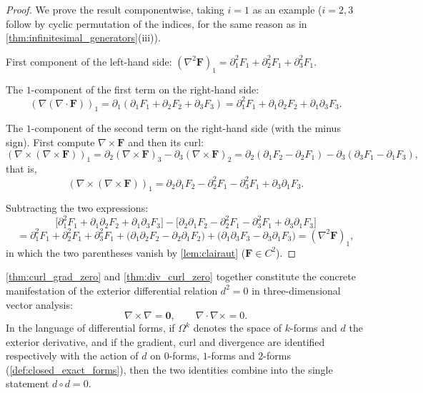 \begin{proof}
We prove the result componentwise, taking $i=1$ as an example ($i=2,3$ follow by cyclic permutation of the indices, for the same reason as in \cref{thm:infinitesimal_generators}(iii)).

First component of the left-hand side: $(\nabla^2\mathbf F)_1 = \partial_1^2F_1+\partial_2^2F_1+\partial_3^2F_1$.

The $1$-component of the first term on the right-hand side:
\[
(\nabla(\nabla\cdot\mathbf F))_1 = \partial_1(\partial_1F_1+\partial_2F_2+\partial_3F_3) = \partial_1^2F_1+\partial_1\partial_2F_2+\partial_1\partial_3F_3 .
\]

The $1$-component of the second term on the right-hand side (with the minus sign). First compute $\nabla\times\mathbf F$ and then its curl:
\[
(\nabla\times(\nabla\times\mathbf F))_1
= \partial_2(\nabla\times\mathbf F)_3-\partial_3(\nabla\times\mathbf F)_2
= \partial_2(\partial_1F_2-\partial_2F_1)-\partial_3(\partial_3F_1-\partial_1F_3),
\]
that is,
\[
(\nabla\times(\nabla\times\mathbf F))_1 = \partial_2\partial_1F_2-\partial_2^2F_1-\partial_3^2F_1+\partial_3\partial_1F_3 .
\]

Subtracting the two expressions:
\[
\bigl[\partial_1^2F_1+\partial_1\partial_2F_2+\partial_1\partial_3F_3\bigr]
-\bigl[\partial_2\partial_1F_2-\partial_2^2F_1-\partial_3^2F_1+\partial_3\partial_1F_3\bigr]
\]
\[
= \partial_1^2F_1+\partial_2^2F_1+\partial_3^2F_1
+\bigl(\partial_1\partial_2F_2-\partial_2\partial_1F_2\bigr)
+\bigl(\partial_1\partial_3F_3-\partial_3\partial_1F_3\bigr)
= (\nabla^2\mathbf F)_1,
\]
in which the two parentheses vanish by \cref{lem:clairaut} ($\mathbf F\in C^2$).
\end{proof}

\begin{corollary}[The vector-analysis formulation of $d^2 = 0$]\label{cor:d2_zero}
\cref{thm:curl_grad_zero} and \cref{thm:div_curl_zero} together constitute the concrete manifestation of the exterior differential relation $d^2=0$ in three-dimensional vector analysis:
\[
\nabla \times \nabla = \mathbf{0}, \qquad \nabla \cdot \nabla \times = 0 .
\]
In the language of differential forms, if $\Omega^k$ denotes the space of $k$-forms and $d$ the exterior derivative, and if the gradient, curl and divergence are identified respectively with the action of $d$ on $0$-forms, $1$-forms and $2$-forms (\cref{def:closed_exact_forms}), then the two identities combine into the single statement $d\circ d=0$.
\end{corollary}

